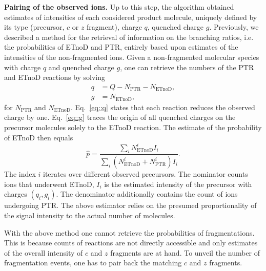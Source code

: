 \documentclass[journal=ancham, manuscript=article, layout=twocolumn]{achemso}
\begin{document}
\noindent\textbf{Pairing of the observed ions.}
Up to this step, the algorithm obtained estimates of intensities of each considered product molecule, uniquely defined by its type (precursor, $c$ or $z$ fragment), charge $q$, quenched charge $g$.
Previously\cite{lermyte2017conformational}, we described a method for the retrieval of information on the branching ratios, i.e. the probabilities of ETnoD and PTR, entirely based upon estimates of the intensities of the non-fragmented ions. 
Given a non-fragmented molecular species with charge $q$ and quenched charge $g$,  one can retrieve the numbers of the PTR and ETnoD reactions by solving
\begin{align}
	q &= Q - N_\text{PTR} - N_\text{ETnoD},\label{eq::q} \\ 
	g &= N_\text{ETnoD},\label{eq::g}
\end{align}
for $N_\text{PTR}$ and $N_\text{ETnoD}$.
Eq.~\eqref{eq::q} states that each reaction reduces the observed charge by one. 
Eq.~\eqref{eq::g} traces the origin of all quenched charges on the precursor molecules solely to the ETnoD reaction. 
The estimate of the probability of ETnoD then equals
\begin{equation*}
	\hat{p} = \frac{ \sum_i N^i_\text{ETnoD}I_i }{ \sum_i (N^i_\text{ETnoD} + N^i_\text{PTR}) I_i }.
\end{equation*}
The index $i$ iterates over different observed precursors.
The nominator counts ions that underwent ETnoD, $I_i$ is the estimated intensity of the precursor with charges $(q_i, g_i)$. 
The denominator additionally contains the count of ions undergoing PTR.
The above estimator relies on the presumed proportionality of the signal intensity to the actual number of molecules. 

With the above method one cannot retrieve the probabilities of fragmentations.
This is because counts of reactions are not directly accessible and only estimates of the overall intensity of $c$ and $z$ fragments are at hand. 
To unveil the number of fragmentation events, one has to pair back the matching $c$ and $z$ fragments.
\end{document}

